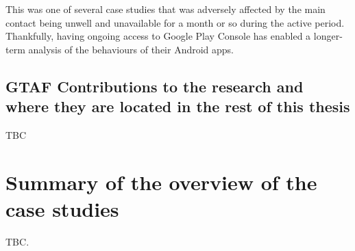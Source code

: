 This was one of several case studies that was adversely affected by the main contact being unwell and unavailable for a month or so during the active period. Thankfully, having ongoing access to Google Play Console has enabled a longer-term analysis of the behaviours of their Android apps.

\subsection{GTAF Contributions to the research and where they are located in the rest of this thesis}
TBC


\clearpage


\section{Summary of the overview of the case studies}
TBC.

